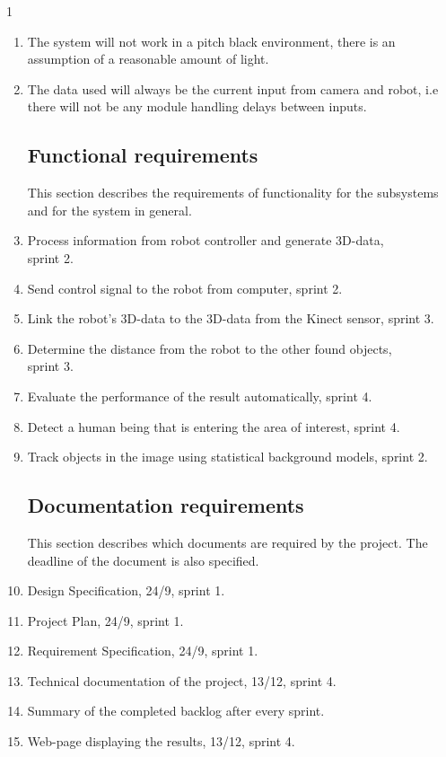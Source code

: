 1\documentclass[10pt,a4paper]{article}
\begin{document}
\begin{enumerate}
\item The system will not work in a pitch black environment, there is an assumption of a reasonable amount of light.

\item The data used will always be the current input from camera and robot, i.e there will not be any module handling delays between inputs.

\subsection{Functional requirements}
This section describes the requirements of functionality for the subsystems and for the system in general.
\item Process information from robot controller and generate 3D-data, \\sprint 2.
\item Send control signal to the robot from computer, sprint 2.
\item Link the robot's 3D-data to the 3D-data from the Kinect sensor, sprint 3.

\item Determine the distance from the robot to the other found objects, \\sprint 3.

\item Evaluate the performance of the result automatically, sprint 4.

\item Detect a human being that is entering the area of interest, sprint 4.

\item Track objects in the image using statistical background models, sprint 2.

\subsection{Documentation requirements}
This section describes which documents are required by the project. The deadline of the document is also specified.
\item Design Specification, 24/9, sprint 1.
\item Project Plan, 24/9, sprint 1.
\item Requirement Specification, 24/9, sprint 1.
\item Technical documentation of the project, 13/12,  sprint 4.
\item Summary of the completed backlog after every sprint.
\item Web-page displaying the results, 13/12, sprint 4.




\end{enumerate}
\end{document}
